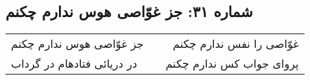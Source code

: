 \begin{center}
\section*{شماره ۳۱: جز غوّاصی هوس ندارم چکنم}
\label{sec:031}
\begin{longtable}{l p{0.5cm} r}
جز غوّاصی هوس ندارم چکنم
&&
غوّاصی را نفس ندارم چکنم
\\
در دریائی فتادهام در گرداب
&&
پروای جواب کس ندارم چکنم
\\
\end{longtable}
\end{center}
